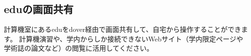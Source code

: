 \documentclass{jarticle}
\begin{document}



\subsection{eduの画面共有}
計算機室にあるeduをdover経由で画面共有して、自宅から操作することができます。
計算機演習や、学内からしか接続できないWebサイト（学内限定ページや学術誌の論文など）の閲覧に活用してください。
\end{document}

